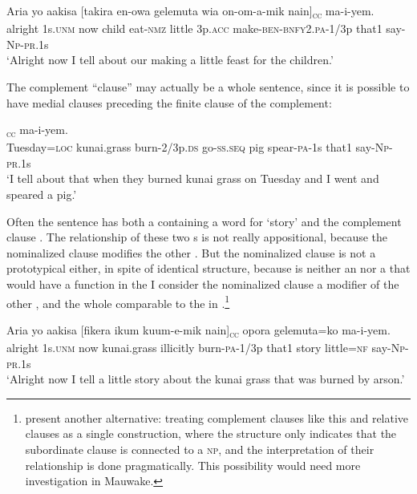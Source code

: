 \ea%
\label{ex:8:x1596}
\gll Aria  yo  aakisa  [takira  en-owa  gelemuta  wia on-om-a-mik  nain]\textsubscript{\textsc{cc}} ma-i-yem.\\
alright  1s.\textsc{unm} now  child eat-\textsc{nmz} little 3p.\textsc{acc} make-\textsc{ben}-\textsc{bnfy}2.\textsc{pa}-1/3p  that1 say-\textsc{Np}-\textsc{pr}.1s\\
\glt`Alright now I tell about our making a little feast for the children.'
\z


The complement ``clause'' may actually be a whole sentence, since it is possible to have medial clauses preceding the finite clause of the complement:

\ea%
\label{ex:8:x1597}
\gll [Tunde=pa  fikera  kuum-iwkin  ikiw-ep  waaya mik-a-m  nain]\textsubscript{\textsc{cc}} ma-i-yem.\\
Tuesday=\textsc{loc} kunai.grass burn-2/3p.\textsc{ds} go-\textsc{ss}.\textsc{seq} pig spear-\textsc{pa}-1s that1 say-\textsc{Np}-\textsc{pr}.1s\\
\glt`I tell about that when they burned kunai grass on Tuesday and I went and speared a pig.'
\z


Often the sentence has both a  containing a word for `story' and the complement clause . The relationship of these two s is not really appositional, because the nominalized clause modifies the other . But the nominalized clause is not a prototypical  either, in spite of identical structure, because  is neither an  nor a  that would have a function in the  I consider the nominalized clause a modifier of the other , and the whole comparable to the  in .\footnote{\citet{ComrieEtAl1995} present another alternative: treating complement clauses like this and relative clauses as a single construction, where the structure only indicates that the subordinate clause is connected to a \textsc{np}, and the interpretation of their relationship is done pragmatically. This possibility would need more investigation in Mauwake.} 

\ea%
\label{ex:8:x1594}
\gll Aria  yo  aakisa  [fikera  ikum  kuum-e-mik  nain]\textsubscript{\textsc{cc}} opora  gelemuta=ko  ma-i-yem.\\
alright  1s.\textsc{unm} now  kunai.grass  illicitly  burn-\textsc{pa}-1/3p  that1 story  little=\textsc{nf} say-\textsc{Np}-\textsc{pr}.1s\\
\glt`Alright now I tell a little story about the kunai grass that was burned by arson.'
\z


